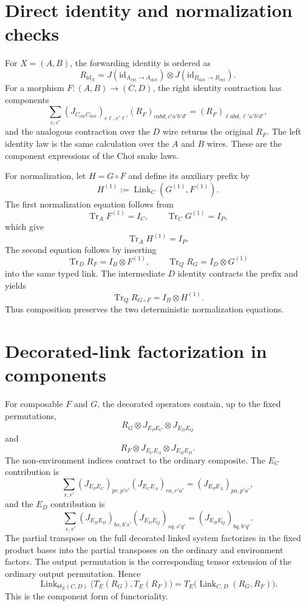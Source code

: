 \documentclass[11pt,a4paper]{article}
\theoremstyle{definition}
\theoremstyle{plain}
\theoremstyle{remark}
\DeclareMathOperator{\Tr}{Tr}
\newcommand{\id}{\mathrm{id}}
\begin{document}
\section{Direct identity and normalization checks}
\label{app:category-checks}

For $X=(A,B)$, the forwarding identity is ordered as
\[
R_{\id_X}
=
J(\id_{A_{\mathrm{ext}}\to A_{\mathrm{slot}}})
\otimes
J(\id_{B_{\mathrm{slot}}\to B_{\mathrm{ext}}}).
\]
For a morphism $F:(A,B)\to(C,D)$, the right identity contraction has
components
\[
\sum_{c,c'}
(J_{C_{\mathrm{ext}}C_{\mathrm{slot}}})_{c\ell,c'\ell'}
(R_F)_{c a b d,c'a'b'd'}
=
(R_F)_{\ell a b d,\ell'a'b'd'},
\]
and the analogous contraction over the $D$ wire returns the original
$R_F$. The left identity law is the same calculation over the $A$ and
$B$ wires. These are the component expressions of the Choi snake laws.

For normalization, let $H=G\circ F$ and define its auxiliary prefix by
\[
H^{(1)}:=\operatorname{Link}_{C}(G^{(1)},F^{(1)}).
\]
The first normalization equation follows from
\[
\Tr_A F^{(1)}=I_C,
\qquad
\Tr_C G^{(1)}=I_P,
\]
which give
\[
\Tr_AH^{(1)}=I_P.
\]
The second equation follows by inserting
\[
\Tr_D R_F=I_B\otimes F^{(1)},
\qquad
\Tr_Q R_G=I_D\otimes G^{(1)}
\]
into the same typed link. The intermediate $D$ identity contracts the
prefix and yields
\[
\Tr_QR_{G\circ F}=I_B\otimes H^{(1)}.
\]
Thus composition preserves the two deterministic normalization equations.

\section{Decorated-link factorization in components}
\label{app:decorated-factorization}

For composable $F$ and $G$, the decorated operators contain, up to the
fixed permutations,
\[
R_G\otimes J_{E_PE_C}\otimes J_{E_DE_Q}
\]
and
\[
R_F\otimes J_{E_CE_A}\otimes J_{E_BE_D}.
\]
The non-environment indices contract to the ordinary composite. The
$E_C$ contribution is
\[
\sum_{r,r'}
(J_{E_PE_C})_{pr,p'r'}
(J_{E_CE_A})_{ra,r'a'}
=(J_{E_PE_A})_{pa,p'a'},
\]
and the $E_D$ contribution is
\[
\sum_{s,s'}
(J_{E_BE_D})_{bs,b's'}
(J_{E_DE_Q})_{sq,s'q'}
=(J_{E_BE_Q})_{bq,b'q'}.
\]
The partial transpose on the full decorated linked system factorizes in
the fixed product bases into the partial transposes on the ordinary and
environment factors. The output permutation is the corresponding tensor
extension of the ordinary output permutation. Hence
\[
\operatorname{Link}_{\Theta_E(C,D)}
\bigl(T_E(R_G),T_E(R_F)\bigr)
=
T_E\bigl(\operatorname{Link}_{C,D}(R_G,R_F)\bigr).
\]
This is the component form of functoriality.
\end{document}
